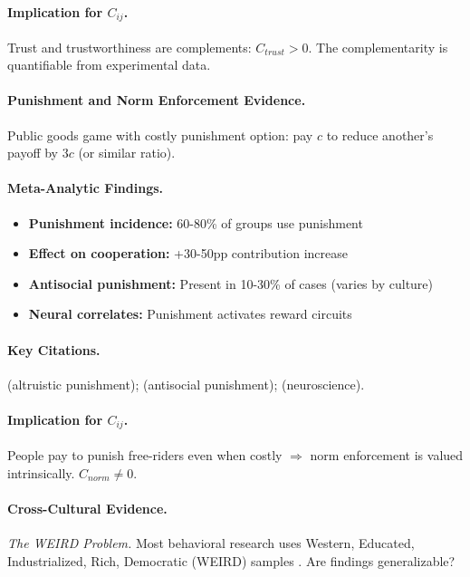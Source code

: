 \paragraph{Implication for $C_{ij}$.}
Trust and trustworthiness are complements: $C_{trust} > 0$.
The complementarity is quantifiable from experimental data.


\paragraph{Punishment and Norm Enforcement Evidence.}
Public goods game with costly punishment option: pay $c$ to reduce
another's payoff by $3c$ (or similar ratio).

\paragraph{Meta-Analytic Findings.}
\begin{itemize}[nosep]
    \item \textbf{Punishment incidence:} 60-80\% of groups use punishment
    \item \textbf{Effect on cooperation:} +30-50pp contribution increase
    \item \textbf{Antisocial punishment:} Present in 10-30\% of cases (varies by culture)
    \item \textbf{Neural correlates:} Punishment activates reward circuits
\end{itemize}

\paragraph{Key Citations.}
\citet{fehrgaechter2002} (altruistic punishment); \citet{herrmannthoeni2008}
(antisocial punishment); \citet{dequervain2004} (neuroscience).

\paragraph{Implication for $C_{ij}$.}
People pay to punish free-riders even when costly $\Rightarrow$
norm enforcement is valued intrinsically. $C_{norm} \neq 0$.


\paragraph{Cross-Cultural Evidence.}
\textit{The WEIRD Problem.}
Most behavioral research uses Western, Educated, Industrialized, Rich,
Democratic (WEIRD) samples \citep{henrich2010}. Are findings generalizable?

